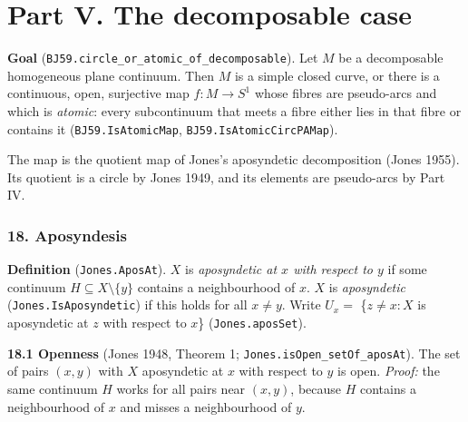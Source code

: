 \documentclass[11pt]{article}
\newcommand{\lean}[1]{\texttt{#1}}
\begin{document}
\bigskip

\part*{Part V. The decomposable case}

\textbf{Goal} (\lean{BJ59.\hspace{0pt}circle\_\hspace{0pt}or\_\hspace{0pt}atomic\_\hspace{0pt}of\_\hspace{0pt}decomposable}). Let $M$ be a decomposable homogeneous plane continuum. Then $M$ is a simple closed curve, or there is a continuous, open, surjective map $f : M \to S^1$ whose fibres are pseudo-arcs and which is \emph{atomic}: every subcontinuum that meets a fibre either lies in that fibre or contains it (\lean{BJ59.\hspace{0pt}IsAtomicMap}, \lean{BJ59.\hspace{0pt}IsAtomicCircPAMap}).

The map is the quotient map of Jones's aposyndetic decomposition (Jones 1955). Its quotient is a circle by Jones 1949, and its elements are pseudo-arcs by Part IV.

\section*{18. Aposyndesis}

\textbf{Definition} (\lean{Jones.\hspace{0pt}AposAt}). $X$ is \emph{aposyndetic at $x$ with respect to $y$} if some continuum $H \subseteq X \setminus \{y\}$ contains a neighbourhood of $x$. $X$ is \emph{aposyndetic} (\lean{Jones.\hspace{0pt}IsAposyndetic}) if this holds for all $x \neq y$. Write $U_x =$ \{$z \neq x : X$ is aposyndetic at $z$ with respect to $x$\} (\lean{Jones.\hspace{0pt}aposSet}).

\textbf{18.1 Openness} (Jones 1948, Theorem 1; \lean{Jones.\hspace{0pt}isOpen\_\hspace{0pt}setOf\_\hspace{0pt}aposAt}). The set of pairs $(x, y)$ with $X$ aposyndetic at $x$ with respect to $y$ is open. \emph{Proof:} the same continuum $H$ works for all pairs near $(x, y)$, because $H$ contains a neighbourhood of $x$ and misses a neighbourhood of $y$.
\end{document}
